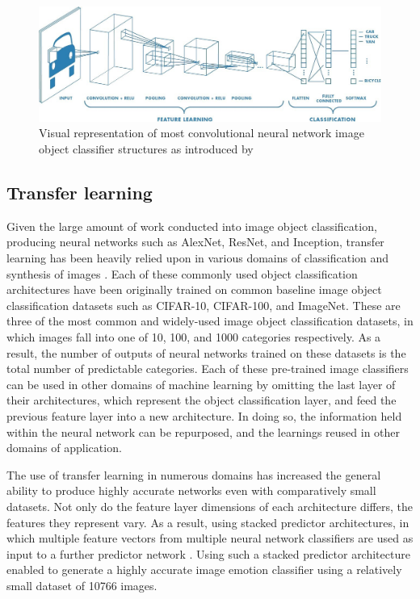 \documentclass{article}
\begin{document}
\begin{figure}[h!]
	\includegraphics[width=\textwidth]{images/convolutional-neural-network.jpg}
	\caption{Visual representation of most convolutional neural network image object classifier structures as introduced by \citet{krizhevsky2012imagenet}}
	\label{fig:CNN}
\end{figure}

\subsection{Transfer learning}

Given the large amount of work conducted into image object classification, producing neural networks such as AlexNet, ResNet, and Inception, transfer learning has been heavily relied upon in various domains of classification and synthesis of images \citep{pan2009survey}.
Each of these commonly used object classification architectures have been originally trained on common baseline image object classification datasets such as CIFAR-10, CIFAR-100, and ImageNet.
These are three of the most common and widely-used image object classification datasets, in which images fall into one of 10, 100, and 1000 categories respectively.
As a result, the number of outputs of neural networks trained on these datasets is the total number of predictable categories.
Each of these pre-trained image classifiers can be used in other domains of machine learning by omitting the last layer of their architectures, which represent the object classification layer, and feed the previous feature layer into a new architecture.
In doing so, the information held within the neural network can be repurposed, and the learnings reused in other domains of application.

The use of transfer learning in numerous domains has increased the general ability to produce highly accurate networks even with comparatively small datasets.
Not only do the feature layer dimensions of each architecture differs, the features they represent vary.
As a result, using stacked predictor architectures, in which multiple feature vectors from multiple neural network classifiers are used as input to a further predictor network \citep{kim2018building}.
Using such a stacked predictor architecture enabled \citet{kim2018building} to generate a highly accurate image emotion classifier using a relatively small dataset of 10766 images.
\end{document}
